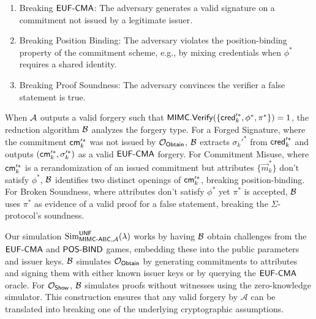 \begin{enumerate} 
\item Breaking $\mathsf{EUF\text{-}CMA}$: The adversary generates a valid signature on a commitment not issued by a legitimate issuer. 
\item Breaking Position Binding: The adversary violates the position-binding property of the commitment scheme, e.g., by mixing credentials when $\phi^*$ requires a shared identity. 
\item Breaking Proof Soundness: The adversary convinces the verifier a false statement is true. 
\end{enumerate}

When $\mathcal{A}$ outputs a valid forgery such that $\mathsf{MIMC.Verify}(\{\mathsf{cred}_k'^*, \phi^*, \pi^*\})=1$, the reduction algorithm $\mathcal{B}$ analyzes the forgery type. For a Forged Signature, where the commitment $\mathsf{cm}_k'^*$ was not issued by $\mathcal{O}_{\mathsf{Obtain}}$, $\mathcal{B}$ extracts $\sigma_k'^*$ from $\mathsf{cred}_k'^*$ and outputs $(\mathsf{cm}_k'^*, \sigma_k'^*)$ as a valid $\mathsf{EUF\text{-}CMA}$ forgery. For Commitment Misuse, where $\mathsf{cm}_k'^*$ is a rerandomization of an issued commitment but attributes $\{\vec{m}_k^*\}$ don't satisfy $\phi^*$, $\mathcal{B}$ identifies two distinct openings of $\mathsf{cm}_k'^*$, breaking position-binding. For Broken Soundness, where attributes don't satisfy $\phi^*$ yet $\pi^*$ is accepted, $\mathcal{B}$ uses $\pi^*$ as evidence of a valid proof for a false statement, breaking the $\Sigma$-protocol's soundness.

Our simulation $\mathrm{Sim}^{\mathsf{UNF}}_{\mathsf{MIMC\text{-}ABC}, \mathcal{A}}(\lambda)$ works by having $\mathcal{B}$ obtain challenges from the $\mathsf{EUF\text{-}CMA}$ and $\mathsf{POS\text{-}BIND}$ games, embedding these into the public parameters and issuer keys. $\mathcal{B}$ simulates $\mathcal{O}_{\mathsf{Obtain}}$ by generating commitments to attributes and signing them with either known issuer keys or by querying the $\mathsf{EUF\text{-}CMA}$ oracle. For $\mathcal{O}_{\mathsf{Show}}$, $\mathcal{B}$ simulates proofs without witnesses using the zero-knowledge simulator. This construction ensures that any valid forgery by $\mathcal{A}$ can be translated into breaking one of the underlying cryptographic assumptions.

